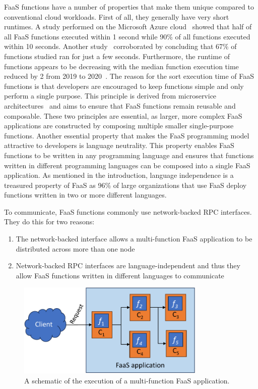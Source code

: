\documentclass[../main.tex]{subfiles}
\begin{document}
\begin{refsection}
FaaS functions have a number of properties that make them unique
compared to conventional cloud workloads. First of all, they generally have very short runtimes. A study performed on the Microsoft Azure cloud~\cite{shahrad20_server_wild} showed that half of all FaaS functions executed within 1 second while 90\% of all functions executed within 10 seconds. Another
study~\cite{eismann20_review_server_use_cases_their_charac}
corroborated by concluding that 67\% of functions studied ran for just a few seconds.  Furthermore, the runtime of functions appears to be decreasing with the median function execution time reduced by 2\texttimes{} from 2019 to 2020~\cite{serverless_state_21}. The reason
for the sort execution time of FaaS functions is that developers are
encouraged to keep functions simple and only perform a single
purpose. This principle is derived from microservice
architectures~\cite{gan19_open_sourc_bench_suite_micros} and aims to
ensure that FaaS functions remain reusable and composable. These two
principles are essential, as larger, more complex FaaS applications
are constructed by composing multiple smaller single-purpose
functions. Another essential property that makes the FaaS programming
model attractive to developers is language neutrality. This property
enables FaaS functions to be written in any programming language and
ensures that functions written in different programming languages can
be composed into a single FaaS application. As mentioned in the
introduction, language independence is a treasured property of FaaS as
96\% of large organizations that use FaaS deploy functions written in
two or more different languages\cite{serverless_state}.

To communicate, FaaS functions commonly use network-backed RPC interfaces. They do this for two reasons:

\begin{enumerate}
\item The network-backed interface allows a multi-function FaaS application to be distributed across more than one node
\item Network-backed RPC interfaces are language-independent and thus they allow FaaS functions written in different languages to communicate
\end{enumerate}

\begin{figure}[ht]
  \centering
\includegraphics[width=0.8\textwidth]{papers/paper5-cofaas/figures/faas_application.pdf}
\caption{\label{fig:faas-app} A schematic of the execution of a multi-function FaaS application.}
\end{figure}


\end{refsection}
\end{document}
